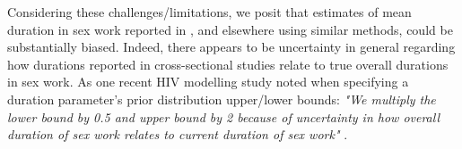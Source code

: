 \begin{table}
  \caption{Methods of estimating mean duration in sex work applied in \cite{Fazito2012}}
  \label{tab:meth}
  
\end{table}
\par
Considering these challenges/limitations,
we posit that estimates of mean duration in sex work
reported in \cite{Fazito2012}, and elsewhere using similar methods,
could be substantially biased.
Indeed, there appears to be uncertainty in general regarding
how durations reported in cross-sectional studies
relate to true overall durations in sex work.
As one recent HIV modelling study noted
when specifying a duration parameter's prior distribution upper/lower bounds:
\emph{"We multiply the lower bound by 0.5 and upper bound by 2
  because of uncertainty in how overall duration of sex work
  relates to current duration of sex work"} \cite{Stone2021}.
